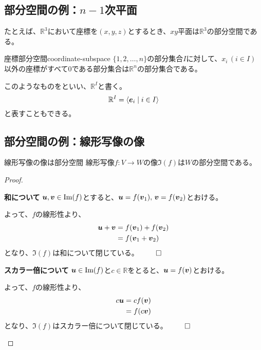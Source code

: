 \documentclass[../../../topic_linear-algebra]{subfiles}
\begin{document}
\subsection{部分空間の例：$n-1$次平面}

たとえば、$\mathbb{R}^3$において座標を$(x, y, z)$とするとき、$xy$平面は$\mathbb{R}^3$の部分空間である。

\begin{definition}{座標部分空間}{coordinate-subspace}
  $\{1, 2, \dots, n\}$の部分集合$I$に対して、$x_i \, (i \in I)$以外の座標がすべて0である部分集合は$\mathbb{R}^n$の部分集合である。

  このようなものをといい、$\mathbb{R}^I$と書く。
  \begin{equation*}
    \mathbb{R}^I = \langle \vb*{e}_i \mid i \in I \rangle
  \end{equation*}
  と表すこともできる。
\end{definition}

\subsection{部分空間の例：線形写像の像}

\begin{theorem*}{線形写像の像は部分空間}
  線形写像$f\colon V \to W$の像$\Im(f)$は$W$の部分空間である。
\end{theorem*}

\begin{proof}
  \begin{subpattern}{\bfseries 和について}
    $\vb*{u}, \vb*{v} \in \Im(f)$とすると、$\vb*{u} = f(\vb*{v}_1),\, \vb*{v} = f(\vb*{v}_2)$とおける。

    よって、$f$の線形性より、
    \begin{align*}
      \vb*{u} + \vb*{v} & = f(\vb*{v}_1) + f(\vb*{v}_2) \\
                        & = f(\vb*{v}_1 + \vb*{v}_2)
    \end{align*}
    となり、$\Im(f)$は和について閉じている。 $\qed$
  \end{subpattern}

  \begin{subpattern}{\bfseries スカラー倍について}
    $\vb*{u} \in \Im(f)$と$c \in \mathbb{R}$をとると、$\vb*{u} = f(\vb*{v})$とおける。

    よって、$f$の線形性より、
    \begin{align*}
      c \vb*{u} & = c f(\vb*{v}) \\
                & = f(c \vb*{v})
    \end{align*}
    となり、$\Im(f)$はスカラー倍について閉じている。 $\qed$
  \end{subpattern}
\end{proof}
\end{document}
